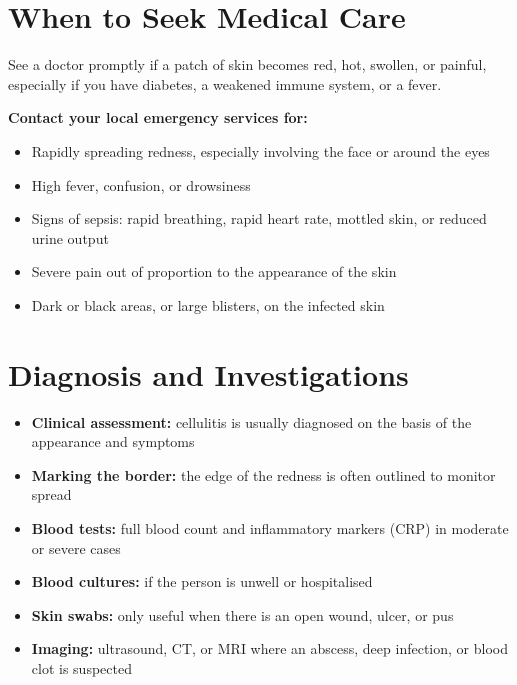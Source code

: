 \section*{When to Seek Medical Care}
See a doctor promptly if a patch of skin becomes red, hot, swollen, or painful, especially if you have diabetes, a weakened immune system, or a fever.

\textbf{Contact your local emergency services for:}
\begin{itemize}
    \item Rapidly spreading redness, especially involving the face or around the eyes
    \item High fever, confusion, or drowsiness
    \item Signs of sepsis: rapid breathing, rapid heart rate, mottled skin, or reduced urine output
    \item Severe pain out of proportion to the appearance of the skin
    \item Dark or black areas, or large blisters, on the infected skin
\end{itemize}

\section*{Diagnosis and Investigations}
\begin{itemize}
    \item \textbf{Clinical assessment:} cellulitis is usually diagnosed on the basis of the appearance and symptoms
    \item \textbf{Marking the border:} the edge of the redness is often outlined to monitor spread
    \item \textbf{Blood tests:} full blood count and inflammatory markers (CRP) in moderate or severe cases
    \item \textbf{Blood cultures:} if the person is unwell or hospitalised
    \item \textbf{Skin swabs:} only useful when there is an open wound, ulcer, or pus
    \item \textbf{Imaging:} ultrasound, CT, or MRI where an abscess, deep infection, or blood clot is suspected
\end{itemize}

